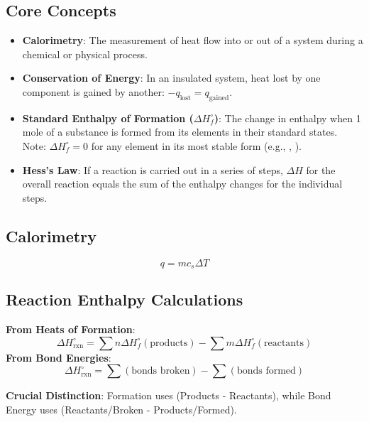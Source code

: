 \documentclass[11pt]{article}
\begin{document}
\subsection{Core Concepts}
\begin{itemize}
    \item \textbf{Calorimetry}: The measurement of heat flow into or out of a system during a chemical or physical process.
    \item \textbf{Conservation of Energy}: In an insulated system, heat lost by one component is gained by another: $-q_{\text{lost}} = q_{\text{gained}}$.
    \item \textbf{Standard Enthalpy of Formation ($\Delta H_f^\circ$)}: The change in enthalpy when 1 mole of a substance is formed from its elements in their standard states. Note: $\Delta H_f^\circ = 0$ for any element in its most stable form (e.g., , ).
    \item \textbf{Hess's Law}: If a reaction is carried out in a series of steps, $\Delta H$ for the overall reaction equals the sum of the enthalpy changes for the individual steps.
\end{itemize}

\subsection{Calorimetry}
\begin{tcolorbox}[provided, title=Specific Heat Equation (Provided)]
    \[ q = m c_s \Delta T \]
\end{tcolorbox}

\subsection{Reaction Enthalpy Calculations}
\begin{tcolorbox}[memorize, title=Enthalpy Calculations *]
    \textbf{From Heats of Formation}:
    \[ \Delta H_{\text{rxn}}^\circ = \sum n\Delta H_f^\circ(\text{products}) - \sum m\Delta H_f^\circ(\text{reactants}) \]
    \vspace{0.2em}
    \textbf{From Bond Energies}:
    \[ \Delta H_{\text{rxn}}^\circ = \sum (\text{bonds broken}) - \sum (\text{bonds formed}) \]
\end{tcolorbox}
\textbf{Crucial Distinction}: Formation uses (Products - Reactants), while Bond Energy uses (Reactants/Broken - Products/Formed).
\end{document}
